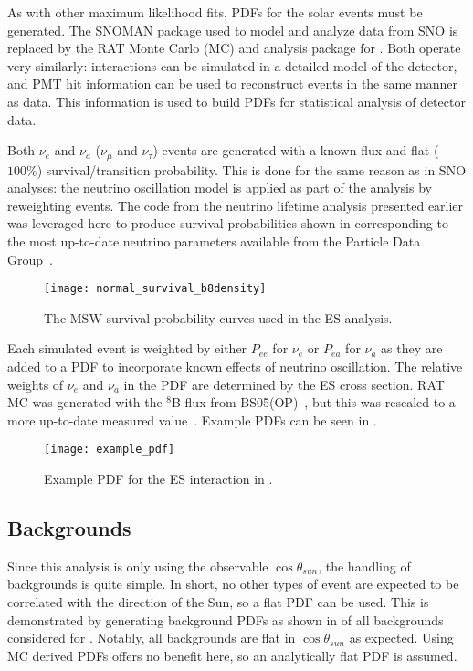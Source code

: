 As with other maximum likelihood fits, PDFs for the solar events must be generated.
The SNOMAN package used to model and analyze data from SNO is replaced by the RAT Monte Carlo (MC) and analysis package for {\snop}.
Both operate very similarly: interactions can be simulated in a detailed model of the detector, and PMT hit information can be used to reconstruct events in the same manner as data.
This information is used to build PDFs for statistical analysis of detector data.

Both $\nu_e$ and $\nu_a$ ($\nu_\mu$ and $\nu_\tau$) events are generated with a known flux and flat ($100\%$) survival/transition probability.
This is done for the same reason as in SNO analyses: the neutrino oscillation model is applied as part of the analysis by reweighting events.
The code from the neutrino lifetime analysis presented earlier was leveraged here to produce survival probabilities shown in  corresponding to the most up-to-date neutrino parameters available from the Particle Data Group~\cite{pdg}.

\begin{figure}
\centering
\texttt{[image: normal\_survival\_b8density]}
\caption{The MSW survival probability curves used in the {\snop} ES analysis.}
\label{fig:solar:msw}
\end{figure}

Each simulated event is weighted by either $P_{ee}$ for $\nu_e$ or $P_{ea}$ for $\nu_a$ as they are added to a PDF to incorporate known effects of neutrino oscillation.
The relative weights of $\nu_e$ and $\nu_a$ in the PDF are determined by the ES cross section.
RAT MC was generated with the $^8$B flux from BS05(OP)~\cite{bs05op}, but this was rescaled to a more up-to-date measured value~\cite{GlobalSolarFlux}.
Example PDFs can be seen in .

\begin{figure}
\centering
\texttt{[image: example\_pdf]}
\caption{Example PDF for the ES interaction in {\snop}.}
\label{fig:solar:pdfs}
\end{figure}

\subsection{Backgrounds}

Since this analysis is only using the observable $\cos{\theta_{sun}}$, the handling of backgrounds is quite simple.
In short, no other types of event are expected to be correlated with the direction of the Sun, so a flat PDF can be used.
This is demonstrated by generating background PDFs as shown in  of all backgrounds considered for {\snop}.
Notably, all backgrounds are flat in $\cos{\theta_{sun}}$ as expected.
Using MC derived PDFs offers no benefit here, so an analytically flat PDF is assumed.

